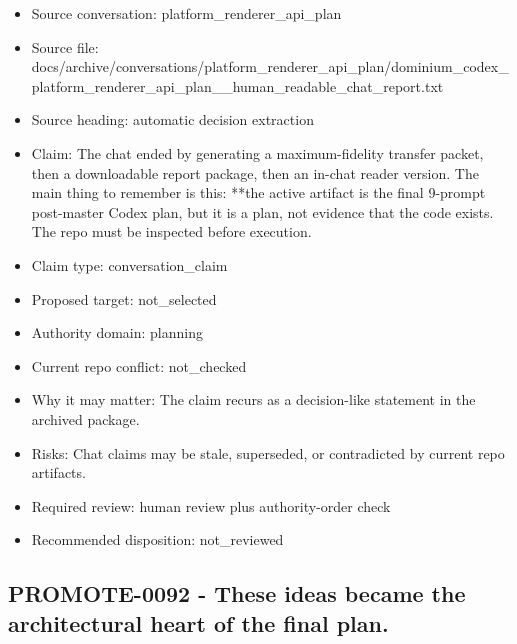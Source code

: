 \documentclass[11pt,a4paper]{report}
\begin{document}
\begin{itemize}
\item Source conversation: platform\_renderer\_api\_plan
\item Source file: docs/archive/conversations/platform\_renderer\_api\_plan/dominium\_codex\_platform\_renderer\_api\_plan\_\_human\_readable\_chat\_report.txt
\item Source heading: automatic decision extraction
\item Claim: The chat ended by generating a maximum-fidelity transfer packet, then a downloadable report package, then an in-chat reader version. The main thing to remember is this: **the active artifact is the final 9-prompt post-master Codex plan, but it is a plan, not evidence that the code exists. The repo must be inspected before execution.
\item Claim type: conversation\_claim
\item Proposed target: not\_selected
\item Authority domain: planning
\item Current repo conflict: not\_checked
\item Why it may matter: The claim recurs as a decision-like statement in the archived package.
\item Risks: Chat claims may be stale, superseded, or contradicted by current repo artifacts.
\item Required review: human review plus authority-order check
\item Recommended disposition: not\_reviewed
\end{itemize}

\subsection{PROMOTE-0092 - These ideas became the architectural heart of the final plan.}
\end{document}
